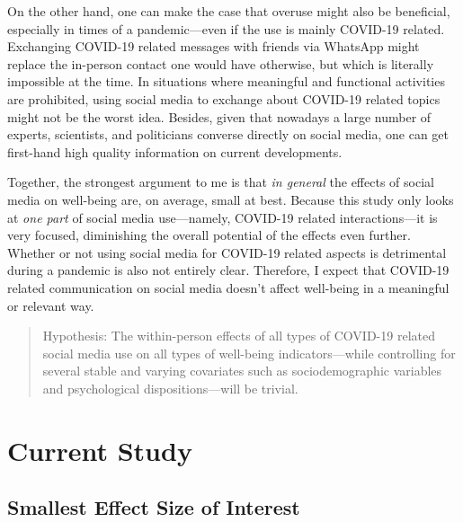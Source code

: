 \documentclass[
  english,
  man,mask,floatsintext]{apa6}
\begin{document}
On the other hand, one can make the case that overuse might also be beneficial, especially in times of a pandemic---even if the use is mainly COVID-19 related.
Exchanging COVID-19 related messages with friends via WhatsApp might replace the in-person contact one would have otherwise, but which is literally impossible at the time.
In situations where meaningful and functional activities are prohibited, using social media to exchange about COVID-19 related topics might not be the worst idea.
Besides, given that nowadays a large number of experts, scientists, and politicians converse directly on social media, one can get first-hand high quality information on current developments.

Together, the strongest argument to me is that \emph{in general} the effects of social media on well-being are, on average, small at best.
Because this study only looks at \emph{one part} of social media use---namely, COVID-19 related interactions---it is very focused, diminishing the overall potential of the effects even further.
Whether or not using social media for COVID-19 related aspects is detrimental during a pandemic is also not entirely clear.
Therefore, I expect that COVID-19 related communication on social media doesn't affect well-being in a meaningful or relevant way.

\begin{quote}
Hypothesis: The within-person effects of all types of COVID-19 related social media use on all types of well-being indicators---while controlling for several stable and varying covariates such as sociodemographic variables and psychological dispositions---will be trivial.
\end{quote}

\hypertarget{current-study}{%
\section{Current Study}\label{current-study}}

\hypertarget{smallest-effect-size-of-interest}{%
\subsection{Smallest Effect Size of Interest}\label{smallest-effect-size-of-interest}}
\end{document}
